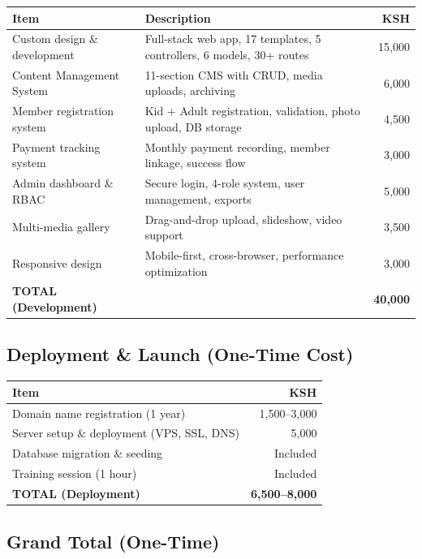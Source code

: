 \documentclass[12pt,a4paper]{article}
\begin{document}
\begin{longtable}{p{5cm}p{5.5cm}r}
    \toprule
    \textbf{Item} & \textbf{Description} & \textbf{KSH} \\
    \midrule
    \endfirsthead
    Custom design \& development & Full-stack web app, 17 templates, 5 controllers, 6 models, 30+ routes & 15,000 \\
    Content Management System & 11-section CMS with CRUD, media uploads, archiving & 6,000 \\
    Member registration system & Kid + Adult registration, validation, photo upload, DB storage & 4,500 \\
    Payment tracking system & Monthly payment recording, member linkage, success flow & 3,000 \\
    Admin dashboard \& RBAC & Secure login, 4-role system, user management, exports & 5,000 \\
    Multi-media gallery & Drag-and-drop upload, slideshow, video support & 3,500 \\
    Responsive design & Mobile-first, cross-browser, performance optimization & 3,000 \\
    \midrule
    \textbf{TOTAL (Development)} & & \textbf{40,000} \\
    \bottomrule
\end{longtable}

\subsection{Deployment \& Launch (One-Time Cost)}

\begin{tabularx}{\textwidth}{Xr}
    \toprule
    \textbf{Item} & \textbf{KSH} \\
    \midrule
    Domain name registration (1 year) & 1,500--3,000 \\
    Server setup \& deployment (VPS, SSL, DNS) & 5,000 \\
    Database migration \& seeding & Included \\
    Training session (1 hour) & Included \\
    \midrule
    \textbf{TOTAL (Deployment)} & \textbf{6,500--8,000} \\
    \bottomrule
\end{tabularx}

\subsection{Grand Total (One-Time)}
\end{document}
